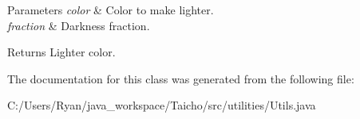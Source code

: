 \begin{DoxyParams}{Parameters}
{\em color} & Color to make lighter. \\
\hline
{\em fraction} & Darkness fraction. \\
\hline
\end{DoxyParams}
\begin{DoxyReturn}{Returns}
Lighter color. 
\end{DoxyReturn}


The documentation for this class was generated from the following file\-:\begin{DoxyCompactItemize}
\item 
C\-:/\-Users/\-Ryan/java\-\_\-workspace/\-Taicho/src/utilities/Utils.\-java\end{DoxyCompactItemize}
